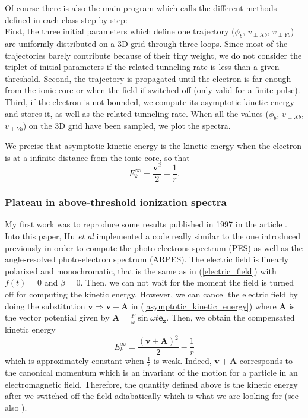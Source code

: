 \documentclass[a4paper]{article}
\begin{document}
Of course there is also the main program which calls the different methods defined in each class step by step: \\
First, the three initial parameters which define one trajectory ($\phi_{b}$, $v_{\perp X b}$, $v_{\perp Y b}$) are uniformly distributed on a 3D grid through three loops. Since most of the trajectories barely contribute because of their tiny weight, we do not consider the triplet of initial parameters if the related tunneling rate is less than a given threshold.
Second, the trajectory is propagated until the electron is far enough from the ionic core or when the field if switched off (only valid for a finite pulse). 
Third, if the electron is not bounded, we compute its asymptotic kinetic energy and stores it, as well as the related tunneling rate.
When all the values ($\phi_{b}$, $v_{\perp X b}$, $v_{\perp Y b}$) on the 3D grid have been sampled, we plot the spectra.
\par 
We precise that asymptotic kinetic energy is the kinetic energy when the electron is at a infinite distance from the ionic core, so that
\begin{equation}
\label{asymptotic_kinetic_energy}
E_{k}^{\infty}=\frac{\mathbf{v}^{2}}{2}-\frac{1}{r}.
\end{equation}

\subsubsection{Plateau in above-threshold ionization spectra}

My first work was to reproduce some results published in 1997 in the article \cite{Hu_1997}. Into this paper, Hu \textit{et al} implemented a code really similar to the one introduced previously in order to compute the photo-electrons spectrum (PES) as well as the angle-resolved photo-electron spectrum (ARPES). The electric field is linearly polarized and monochromatic, that is the same as in (\ref{electric_field}) with $f(t)=0$ and $\beta=0$. Then, we can not wait for the moment the field is turned off for computing the kinetic energy. However, we can cancel the electric field by doing the substitution $\mathbf{v}\Rightarrow\mathbf{v}+\mathbf{A}$ in (\ref{asymptotic_kinetic_energy}) where $\mathbf{A}$ is the vector potential given by $\mathbf{A}=\tfrac{F}{\omega}\sin{\omega t}\mathbf{e_{z}}$. Then, we obtain the compensated kinetic energy
\begin{equation}
E_{k}^{\infty}=\frac{(\mathbf{v}+\mathbf{A})^{2}}{2}-\frac{1}{r}
\end{equation}
which is approximately constant when $\frac{1}{r}$ is weak. Indeed, $\mathbf{v}+\mathbf{A}$ corresponds to the canonical momentum which is an invariant of the motion for a particle in an electromagnetic field. Therefore, the quantity defined above is the kinetic energy after we switched off the field adiabatically which is what we are looking for (see also \cite{Leopold_1979}).
\par 
\end{document}
